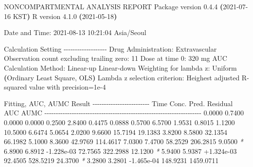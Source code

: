 \documentclass[
  11pt,
  krantz2, a4paper, twoside]{krantz}
\newenvironment{Shaded}{\begin{snugshade}}{\end{snugshade}}
\newcommand{\AttributeTok}[1]{\textcolor[rgb]{0.77,0.63,0.00}{#1}}
\newcommand{\ErrorTok}[1]{\textcolor[rgb]{0.64,0.00,0.00}{\textbf{#1}}}
\newcommand{\ExtensionTok}[1]{#1}
\newcommand{\KeywordTok}[1]{\textcolor[rgb]{0.13,0.29,0.53}{\textbf{#1}}}
\newcommand{\NormalTok}[1]{#1}
\newcommand{\PreprocessorTok}[1]{\textcolor[rgb]{0.56,0.35,0.01}{\textit{#1}}}
\theoremstyle{definition}
\theoremstyle{definition}
\theoremstyle{definition}
\theoremstyle{definition}
\theoremstyle{remark}
\begin{document}
\small

\begin{Shaded}
\begin{Highlighting}[]
                        \ExtensionTok{NONCOMPARTMENTAL}\NormalTok{ ANALYSIS REPORT}
                       \ExtensionTok{Package}\NormalTok{ version 0.4.4 }\ErrorTok{(}\ExtensionTok{2021{-}07{-}16}\NormalTok{ KST}\KeywordTok{)}
                          \ExtensionTok{R}\NormalTok{ version 4.1.0 }\ErrorTok{(}\ExtensionTok{2021{-}05{-}18}\KeywordTok{)}

\ExtensionTok{Date}\NormalTok{ and Time: 2021{-}08{-}13 10:21:04 Asia/Seoul}

\ExtensionTok{Calculation}\NormalTok{ Setting}
\ExtensionTok{{-}{-}{-}{-}{-}{-}{-}{-}{-}{-}{-}{-}{-}{-}{-}{-}{-}{-}{-}}
\ExtensionTok{Drug}\NormalTok{ Administration: Extravascular}
\ExtensionTok{Observation}\NormalTok{ count excluding trailing zero: 11}
\ExtensionTok{Dose}\NormalTok{ at time 0: 320 mg}
\ExtensionTok{AUC}\NormalTok{ Calculation Method: Linear{-}up Linear{-}down}
\ExtensionTok{Weighting}\NormalTok{ for lambda z: Uniform }\ErrorTok{(}\ExtensionTok{Ordinary}\NormalTok{ Least Square, OLS}\KeywordTok{)}
\ExtensionTok{Lambda}\NormalTok{ z selection criterion: Heighest adjusted R{-}squared value with precision=1e{-}4}


\ExtensionTok{Fitting,}\NormalTok{ AUC, AUMC Result}
\ExtensionTok{{-}{-}{-}{-}{-}{-}{-}{-}{-}{-}{-}{-}{-}{-}{-}{-}{-}{-}{-}{-}{-}{-}{-}{-}{-}}
      \ExtensionTok{Time}\NormalTok{         Conc.      Pred.   Residual       AUC       AUMC}
\ExtensionTok{{-}{-}{-}{-}{-}{-}{-}{-}{-}{-}{-}{-}{-}{-}{-}{-}{-}{-}{-}{-}{-}{-}{-}{-}{-}{-}{-}{-}{-}{-}{-}{-}{-}{-}{-}{-}{-}{-}{-}{-}{-}{-}{-}{-}{-}{-}{-}{-}{-}{-}{-}{-}{-}{-}{-}{-}{-}{-}{-}{-}{-}{-}{-}{-}{-}{-}{-}{-}{-}}
     \ExtensionTok{0.0000}\NormalTok{       0.7400                           0.0000     0.0000}
     \ExtensionTok{0.2500}\NormalTok{       2.8400                           0.4475     0.0888}
     \ExtensionTok{0.5700}\NormalTok{       6.5700                           1.9531     0.8015}
     \ExtensionTok{1.1200}\NormalTok{      10.5000                           6.6474     5.0654}
     \ExtensionTok{2.0200}\NormalTok{       9.6600                          15.7194    19.1383}
     \ExtensionTok{3.8200}\NormalTok{       8.5800                          32.1354    66.1982}
     \ExtensionTok{5.1000}\NormalTok{       8.3600                          42.9769   114.4617}
     \ExtensionTok{7.0300}\NormalTok{       7.4700                          58.2529   206.2815}
     \ExtensionTok{9.0500} \PreprocessorTok{*}\NormalTok{     6.8900     6.8912 }\AttributeTok{{-}1.228e{-}03}\NormalTok{    72.7565   322.2988}
    \ExtensionTok{12.1200} \PreprocessorTok{*}\NormalTok{     5.9400     5.9387 +1.324e{-}03    92.4505   528.5219}
    \ExtensionTok{24.3700} \PreprocessorTok{*}\NormalTok{     3.2800     3.2801 }\AttributeTok{{-}1.465e{-}04}\NormalTok{   148.9231  1459.0711}


\end{Highlighting}
\end{Shaded}
\end{document}
